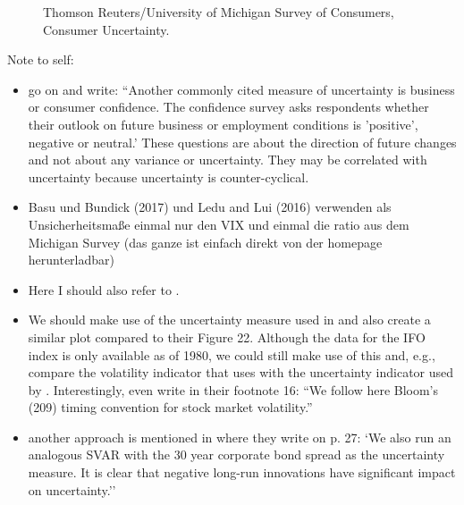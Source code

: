 \documentclass[a4paper,12pt,oneside,pointednumbers,bibtotoc,bigheadings,liststotoc]{scrbook}
\begin{document}
\begin{figure}[!h]
   \centering
   \setlength\fboxsep{0pt}
   \setlength\fboxrule{0pt}
      \caption[Thomson Reuters/University of Michigan Survey of Consumers, Consumer Uncertainty.]{Thomson Reuters/University of Michigan Survey of Consumers, Consumer Uncertainty.}   \label{fig:michigan_plot}
\end{figure}

\begingroup
    \fontsize{8pt}{12pt}\selectfont
    Note to self:
\begin{itemize}
	\item \citet{orlikandveldkamp:14} go on and write: ``Another commonly cited measure of uncertainty is business or consumer confidence. The confidence survey asks respondents whether their outlook on future business or employment conditions is 'positive', negative or neutral.' These questions are about the direction of future changes and not about any variance or uncertainty. They may be correlated with uncertainty because uncertainty is counter-cyclical.\\
	\item Basu und Bundick (2017) und Ledu and Lui (2016) verwenden als Unsicherheitsmaße einmal nur den VIX und einmal die ratio aus dem Michigan Survey (das ganze ist einfach direkt von der homepage herunterladbar)\\
	\item Here I should also refer to \citet{bachmannetal:13}.
	\item We should make use of the uncertainty measure used in \citet{bachmannetal:13} and also create a similar plot compared to their Figure 22. Although the data for the IFO index is only available as of 1980, we could still make use of this and, e.g., compare the volatility indicator that \citet{bloom:09} uses with the uncertainty indicator used by \citet{bachmannetal:13}. Interestingly, \citet{bachmannetal:13} even write in their footnote 16: ``We follow here Bloom's (209) timing convention for stock market volatility.''
	\item another approach is mentioned in \citet{bachmannetal:13} where they write on p. 27: `We also run an analogous SVAR with the 30 year corporate bond spread as the uncertainty measure. It is clear that negative long-run innovations have significant impact on uncertainty.''
\end{itemize}
\endgroup
\end{document}
